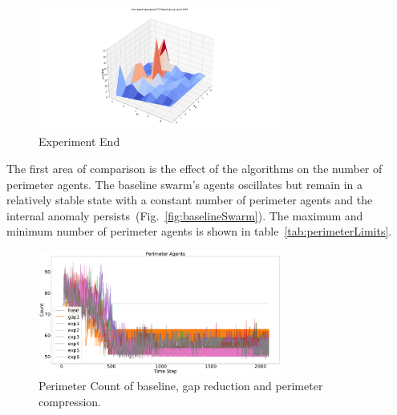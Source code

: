 \documentclass[12pt,a4paper]{IEEEtran}
\begin{document}
\begin{figure}[H]
	\begin{center}
		\includegraphics[width=8cm]{figures/Experiment3}
	\end{center}
	\caption{Experiment End \label{fig:experiment3}}
\end{figure}

The first area of comparison is the effect of the algorithms on the number of perimeter agents. The baseline swarm's agents oscillates but remain in a relatively stable state with a constant number of perimeter agents and the internal anomaly persists~(Fig.~\ref{fig:baselineSwarm}). The maximum and minimum number of perimeter agents is shown in table~\ref{tab:perimeterLimits}. 

\begin{figure}[H]
	\begin{center}
		\includegraphics[width=8cm]{figures/PerimeterCount}
	\end{center}
	\caption{Perimeter Count of baseline, gap reduction and perimeter compression. \label{fig:perimeterCount}}
\end{figure}
\end{document}
